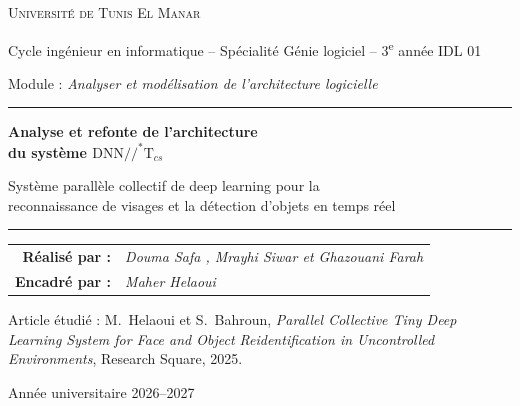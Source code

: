 \documentclass[11pt,a4paper]{report}
\newcommand{\dnnTcs}{\ensuremath{\mathrm{DNN}/\!/^{*}\mathrm{T}_{cs}}}
\begin{document}

\begin{titlepage}
  \centering
  {\large \textsc{Université de Tunis El Manar}\par}
  \vspace{2pt}
  {\normalsize Cycle ingénieur en informatique -- Spécialité Génie logiciel -- 3\textsuperscript{e} année IDL 01\par}
  \vspace{0.5cm}
  {\normalsize Module : \textit{Analyser et modélisation de l'architecture logicielle}\par}
  \vspace{3cm}
  \rule{\linewidth}{0.8pt}\par\vspace{0.4cm}
  {\LARGE\bfseries Analyse et refonte de l'architecture\\[4pt]
   du système \dnnTcs\par}
  \vspace{0.3cm}
  {\large Système parallèle collectif de deep learning pour la\\
   reconnaissance de visages et la détection d'objets en temps réel\par}
  \vspace{0.4cm}
  \rule{\linewidth}{0.8pt}\par
  \vspace{2.2cm}
  \begin{tabular}{rl}
    \textbf{Réalisé par :} & \textit{Douma Safa , Mrayhi Siwar et Ghazouani Farah}\\[4pt]
    \textbf{Encadré par :} & \textit{Maher Helaoui}\\
  \end{tabular}
  \vfill
  {\normalsize Article étudié : M.~Helaoui et S.~Bahroun, \textit{Parallel Collective Tiny Deep Learning System for Face and Object Reidentification in Uncontrolled Environments}, Research Square, 2025.\par}
  \vspace{0.8cm}
  {\large Année universitaire 2026--2027\par}
\end{titlepage}

\tableofcontents
\listoffigures
\listoftables

\end{document}
